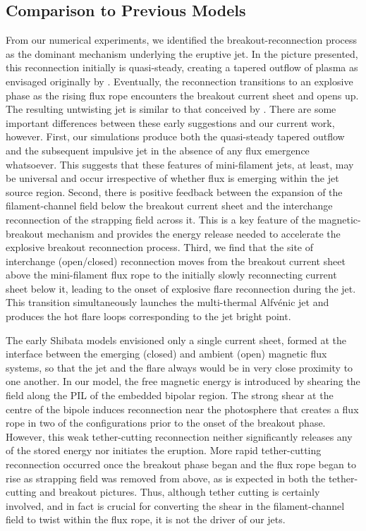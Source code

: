 \documentclass[twocolumn]{aastex6}
\begin{document}
\subsection{Comparison to Previous Models}
From our numerical experiments, we identified the breakout-reconnection process as the dominant mechanism underlying the eruptive jet. In the picture presented, this reconnection initially is quasi-steady, creating a tapered outflow of plasma as envisaged originally by \citet{Shibata1992}. Eventually, the reconnection transitions to an explosive phase as the rising flux rope encounters the breakout current sheet and opens up. The resulting untwisting jet is similar to that conceived by \citet{Shibata1986}. There are some important differences between these early suggestions and our current work, however. First, our simulations produce both the quasi-steady tapered outflow and the subsequent impulsive jet in the absence of any flux emergence whatsoever. This suggests that these features of mini-filament jets, at least, may be universal and occur irrespective of whether flux is emerging within the jet source region. Second, there is positive feedback between the expansion of the filament-channel field below the breakout current sheet and the interchange reconnection of the strapping field across it. This is a key feature of the magnetic-breakout mechanism \citep{Antiochos1999} and provides the energy release needed to accelerate the explosive breakout reconnection process. Third, we find that the site of interchange (open/closed) reconnection moves from the breakout current sheet above the mini-filament flux rope to the initially slowly reconnecting current sheet below it, leading to the onset of explosive flare reconnection during the jet. This transition simultaneously launches the multi-thermal Alfv\'enic jet and produces the hot flare loops corresponding to the jet bright point.

The early Shibata models envisioned only a single current sheet, formed at the interface between the emerging (closed) and ambient (open) magnetic flux systems, so that the jet and the flare always would be in very close proximity to one another. In our model, the free magnetic energy is introduced by shearing the field along the PIL of the embedded bipolar region. The strong shear at the centre of the bipole induces reconnection near the photosphere that creates a flux rope in two of the configurations prior to the onset of the breakout phase. However, this weak tether-cutting reconnection \citep{Moore1992,Moore2001} neither significantly releases any of the stored energy nor initiates the eruption. More rapid tether-cutting reconnection occurred once the breakout phase began and the flux rope began to rise as strapping field was removed from above, as is expected in both the tether-cutting and breakout pictures. Thus, although tether cutting is certainly involved, and in fact is crucial for converting the shear in the filament-channel field to twist within the flux rope, it is not the driver of our jets.
\end{document}

